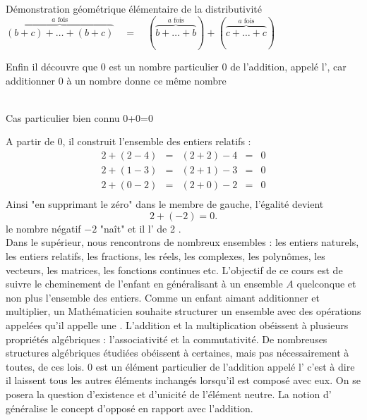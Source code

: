 \documentclass{book}
\begin{document}
\begin{Texte}
\begin{itemize}
\begin{center}
\begin{tikzpicture}
\end{tikzpicture}\\
Démonstration géométrique élémentaire de la distributivité  $\overbrace{(b+c)+\dots+(b+c)}^{a \text{ fois}}\quad=\quad  ( \overbrace{b+\dots+b}^{a \text{ fois}})+(\overbrace{c+\dots+c}^{a \text{ fois}})$
\end{center}
 \end{itemize}
Enfin il découvre que $0$ est  un nombre particulier $0$ de l'addition, appelé l', car additionner $0$ à un nombre donne ce même nombre 
\begin{center}
 \\
Cas particulier bien connu 0+0=0
\end{center}
A partir de $0$,  il construit l'ensemble des entiers relatifs :
$$\begin{aligned}
2+(2-4)&=&(2+2)-4&=&0\\
2+(1-3)&=&(2+1)-3&=&0\\
2+(0-2)&=&(2+0)-2&=&0\\
\end{aligned}$$
Ainsi "en supprimant le zéro" dans le membre de gauche, l'égalité devient 
$$2+(-2)=0.$$
le nombre négatif $-2$ "naît" et il l' de 2 .\\ 
Dans le supérieur, nous rencontrons de nombreux ensembles : les entiers naturels, les entiers relatifs, les fractions, les réels, les complexes, les polynômes, les vecteurs, les matrices, les fonctions continues etc.  L'objectif de ce cours est de suivre le cheminement de l'enfant en généralisant à un ensemble  $A$  quelconque et non plus l'ensemble des entiers. 
Comme un enfant aimant additionner et multiplier, un Mathématicien souhaite structurer un ensemble avec des opérations appelées  qu'il appelle une . L'addition et la multiplication  obéissent à plusieurs propriétés algébriques : l'associativité et la commutativité. De nombreuses structures algébriques étudiées obéissent à certaines, mais pas nécessairement à toutes, de ces lois. $0$ est un élément particulier de l'addition appelé l' c'est à dire il laissent tous les autres éléments inchangés lorsqu'il est composé avec eux. On se posera la question d'existence et d'unicité de l'élément neutre. La notion d' généralise le concept d'opposé en rapport avec l'addition.\\
 
\end{Texte}
\end{document}
